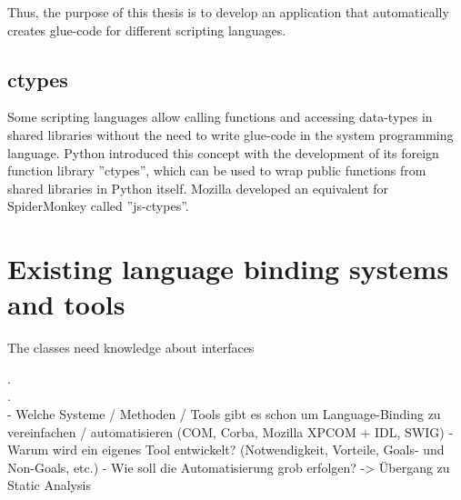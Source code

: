 Thus, the purpose of this thesis is to develop an application that automatically creates glue-code for different scripting languages.

\subsection{ctypes}

Some scripting languages allow calling functions and accessing data-types in shared libraries without the need to write glue-code in the system programming language. Python introduced this concept with the development of its foreign function library ''ctypes'', which can be used to wrap public functions from shared libraries in Python itself. Mozilla developed an equivalent for SpiderMonkey called ''js-ctypes''.

\section{Existing language binding systems and tools}

The classes need knowledge about interfaces

.\\
.\\
  - Welche Systeme / Methoden / Tools gibt es schon um Language-Binding zu vereinfachen / automatisieren (COM, Corba, Mozilla XPCOM + IDL, SWIG)
  - Warum wird ein eigenes Tool entwickelt? (Notwendigkeit, Vorteile, Goals- und Non-Goals, etc.)
  - Wie soll die Automatisierung grob erfolgen? -> Übergang zu Static Analysis